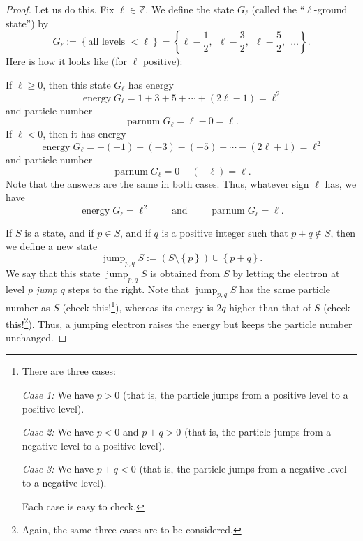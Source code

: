 \begin{proof}
Let us do this. Fix $\ell\in\mathbb{Z}$. We define the state $G_{\ell}$
(called the \textquotedblleft$\ell$-ground state\textquotedblright) by%
\[
G_{\ell}:=\left\{  \text{all levels }<\ell\right\}  =\left\{  \ell-\dfrac
{1}{2},\ \ \ell-\dfrac{3}{2},\ \ \ell-\dfrac{5}{2},\ \ \ldots\right\}  .
\]
Here is how it looks like (for $\ell$ positive):%
\[%
\]


If $\ell\geq0$, then this state $G_{\ell}$ has energy
\[
\operatorname*{energy}G_{\ell}=1+3+5+\cdots+\left(  2\ell-1\right)  =\ell^{2}%
\]
and particle number%
\[
\operatorname*{parnum}G_{\ell}=\ell-0=\ell.
\]
If $\ell<0$, then it has energy%
\[
\operatorname*{energy}G_{\ell}=-\left(  -1\right)  -\left(  -3\right)
-\left(  -5\right)  -\cdots-\left(  2\ell+1\right)  =\ell^{2}%
\]
and particle number%
\[
\operatorname*{parnum}G_{\ell}=0-\left(  -\ell\right)  =\ell.
\]
Note that the answers are the same in both cases. Thus, whatever sign $\ell$
has, we have%
\[
\operatorname*{energy}G_{\ell}=\ell^{2}\ \ \ \ \ \ \ \ \ \ \text{and}%
\ \ \ \ \ \ \ \ \ \ \operatorname*{parnum}G_{\ell}=\ell.
\]


If $S$ is a state, and if $p\in S$, and if $q$ is a positive integer such that
$p+q\notin S$, then we define a new state%
\[
\operatorname*{jump}\nolimits_{p,q}S:=\left(  S\setminus\left\{  p\right\}
\right)  \cup\left\{  p+q\right\}  .
\]
We say that this state $\operatorname*{jump}\nolimits_{p,q}S$ is obtained from
$S$ by letting the electron at level $p$ \emph{jump} $q$ steps to the right.
Note that $\operatorname*{jump}\nolimits_{p,q}S$ has the same particle number
as $S$ (check this!\footnote{There are three cases:
\par
\textit{Case 1:} We have $p>0$ (that is, the particle jumps from a positive
level to a positive level).
\par
\textit{Case 2:} We have $p<0$ and $p+q>0$ (that is, the particle jumps from a
negative level to a positive level).
\par
\textit{Case 3:} We have $p+q<0$ (that is, the particle jumps from a negative
level to a negative level).
\par
Each case is easy to check.}), whereas its energy is $2q$ higher than that of
$S$ (check this!\footnote{Again, the same three cases are to be considered.}).
Thus, a jumping electron raises the energy but keeps the particle number unchanged.


\end{proof}
